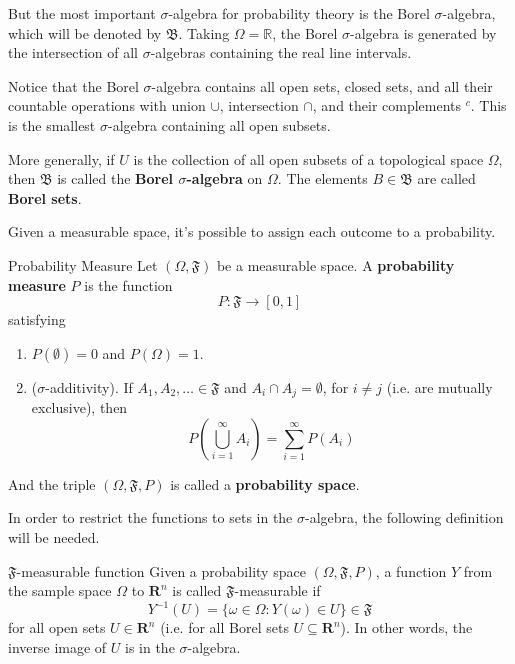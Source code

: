But the most important $\sigma$-algebra for probability theory is the Borel $\sigma$-algebra, which will be denoted by $\mathfrak{B}$. Taking $\Omega = \mathbb{R}$, the Borel $\sigma$-algebra is generated by the intersection of all $\sigma$-algebras containing the real line intervals.

Notice that the Borel $\sigma$-algebra contains all open sets, closed sets, and all their countable operations with union $\cup$, intersection $\cap$, and their complements $^c$. This is the smallest $\sigma$-algebra containing all open subsets.

More generally, if $U$ is the collection of all open subsets of a topological space $\Omega$, then $\mathfrak{B}$ is called the \textbf{Borel $\sigma$-algebra} on $\Omega$. The elements $B \in \mathfrak{B}$ are called \textbf{Borel sets}.

Given a measurable space, it's possible to assign each outcome to a probability.

\begin{definition}[]{Probability Measure}{}
	Let $(\Omega, \mathfrak{F})$ be a measurable space. A \textbf{probability measure} $P$ is the function
	\[
		P : \mathfrak{F} \longrightarrow [0,1]
	\]
	satisfying
	\begin{enumerate}
		\item $P(\emptyset) = 0$ and $P(\Omega) = 1$.
		\item ($\sigma$-additivity). If $A_1, A_2, \ldots \in \mathfrak{F}$ and $A_i \cap A_j = \emptyset$, for $i \neq j$ (i.e. are mutually exclusive), then \[ P \left( \bigcup_{i=1}^\infty A_i \right) = \sum_{i=1}^\infty P(A_i)\]
	\end{enumerate}
	
	And the triple $(\Omega, \mathfrak{F}, P)$ is called a \textbf{probability space}.
\end{definition}

In order to restrict the functions to sets in the $\sigma$-algebra, the following definition will be needed.

\begin{definition}[]{$\mathfrak{F}$-measurable function}{}
	Given a probability space $(\Omega, \mathfrak{F}, P)$, a function $Y$ from the sample space $\Omega$ to $\textbf{R}^n$ is called $\mathfrak{F}$-measurable if
	\[
		Y^{-1}(U) = \{ \omega \in \Omega : Y(\omega) \in U\} \in \mathfrak{F}
	\]
	for all open sets $U \in \textbf{R}^n$ (i.e. for all Borel sets $U \subseteq \textbf{R}^n$). In other words, the inverse image of $U$ is in the $\sigma$-algebra.
\end{definition} 

